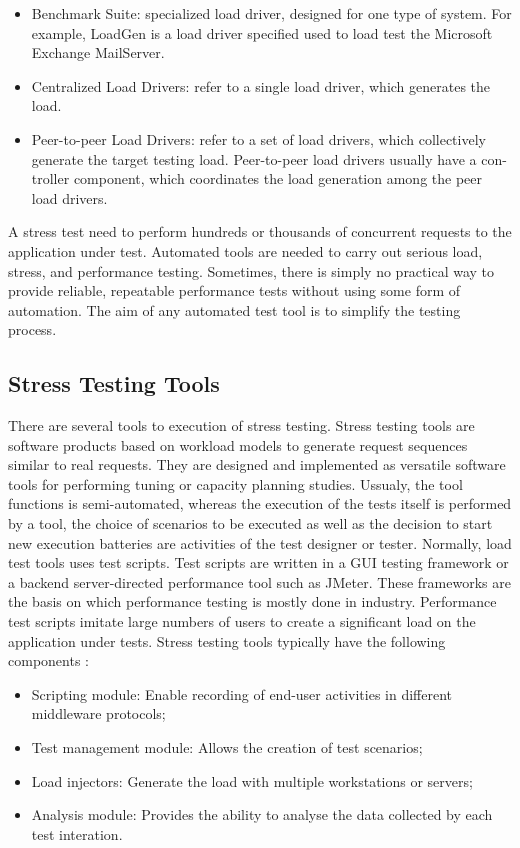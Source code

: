 \documentclass[espaco=umemeio,chapter=TITLE,twoside,openright]{abnt}
\begin{document}
\begin{itemize}
\item Benchmark Suite: specialized load driver, designed for one type of system. For example, LoadGen is a load driver specified used to load test the Microsoft Exchange MailServer.
\item  Centralized Load Drivers: refer to a single load driver, which generates the load.
\item Peer-to-peer Load Drivers: refer to a set of load drivers, which collectively generate the target testing load. Peer-to-peer load drivers usually have a con- troller component, which coordinates the load generation among the peer load drivers.
\end{itemize}

A stress test need to perform hundreds or thousands of concurrent requests  to the application under test. Automated tools are needed to carry out serious load, stress, and performance testing. Sometimes, there is simply no practical way to provide reliable, repeatable performance tests without using some form of automation. The aim of any automated test tool is to simplify the testing process.


\subsection{Stress Testing Tools}

There are several tools to execution of stress testing. Stress testing tools are software products based on workload models to generate request sequences similar to real requests. They are designed and implemented as versatile software tools for performing tuning or capacity planning studies. Ussualy, the tool functions is semi-automated, whereas the execution of the tests itself is performed by a tool, the choice of scenarios to be executed as well as the decision to start new execution batteries are activities of the test designer or tester. Normally, load test tools uses test scripts. Test scripts are written in a GUI testing framework or a backend server-directed performance tool such as JMeter. These frameworks are the basis on which performance testing is mostly done in industry. Performance test scripts imitate large numbers of users to create a significant load on the application under tests. Stress testing tools typically have the following components \cite{Grechanik2012} \cite{Molyneaux2009}:

\begin{itemize}
\item Scripting module: Enable recording of end-user activities in different middleware protocols;
\item Test management module: Allows the creation of test scenarios;
\item Load injectors: Generate the load with multiple workstations or servers;
\item Analysis module: Provides the ability to analyse the data collected by each test interation.
\end{itemize}
\end{document}
